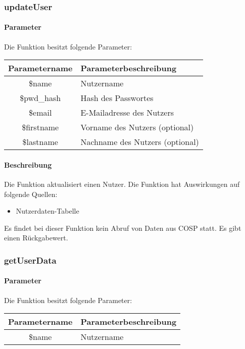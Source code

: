 \subsubsection{updateUser}
\paragraph{Parameter} Die Funktion besitzt folgende Parameter:
\begin{table}[H]
	\begin{tabular}{|c|p{11cm}|}
		\hline
		\textbf{Parametername} & \textbf{Parameterbeschreibung} \\ \hline
		\$name      & Nutzername \\ \hline
		\$pwd\_hash & Hash des Passwortes \\ \hline
		\$email     & E-Mailadresse des Nutzers \\ \hline
		\$firstname & Vorname des Nutzers (optional) \\ \hline
		\$lastname  & Nachname des Nutzers (optional) \\ \hline
	\end{tabular}
\end{table}
\paragraph{Beschreibung} Die Funktion aktualisiert einen Nutzer. Die Funktion hat Auswirkungen auf folgende Quellen:
\begin{itemize}
	\item Nutzerdaten-Tabelle
\end{itemize}
Es findet bei dieser Funktion kein Abruf von Daten aus {\glqq COSP\grqq} statt. Es gibt einen Rückgabewert.
\subsubsection{getUserData}
\paragraph{Parameter} Die Funktion besitzt folgende Parameter:
\begin{table}[H]
	\begin{tabular}{|c|p{11cm}|}
		\hline
		\textbf{Parametername} & \textbf{Parameterbeschreibung} \\ \hline
		\$name & Nutzername \\ \hline
	\end{tabular}
\end{table}
